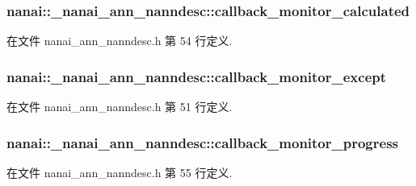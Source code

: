 \subsubsection[{callback\+\_\+monitor\+\_\+calculated}]{ nanai\+::\+\_\+nanai\+\_\+ann\+\_\+nanndesc\+::callback\+\_\+monitor\+\_\+calculated}\label{structnanai_1_1__nanai__ann__nanndesc_a6e0e1cd8cef94d4a1581d1e32265eac3}


在文件 nanai\+\_\+ann\+\_\+nanndesc.\+h 第 54 行定义.

\hypertarget{structnanai_1_1__nanai__ann__nanndesc_a9a0e18b816789572937a49aaecee6a60}{}
\subsubsection[{callback\+\_\+monitor\+\_\+except}]{ nanai\+::\+\_\+nanai\+\_\+ann\+\_\+nanndesc\+::callback\+\_\+monitor\+\_\+except}\label{structnanai_1_1__nanai__ann__nanndesc_a9a0e18b816789572937a49aaecee6a60}


在文件 nanai\+\_\+ann\+\_\+nanndesc.\+h 第 51 行定义.

\hypertarget{structnanai_1_1__nanai__ann__nanndesc_aab1e435593bf3710373696cb0b95870d}{}
\subsubsection[{callback\+\_\+monitor\+\_\+progress}]{ nanai\+::\+\_\+nanai\+\_\+ann\+\_\+nanndesc\+::callback\+\_\+monitor\+\_\+progress}\label{structnanai_1_1__nanai__ann__nanndesc_aab1e435593bf3710373696cb0b95870d}


在文件 nanai\+\_\+ann\+\_\+nanndesc.\+h 第 55 行定义.


